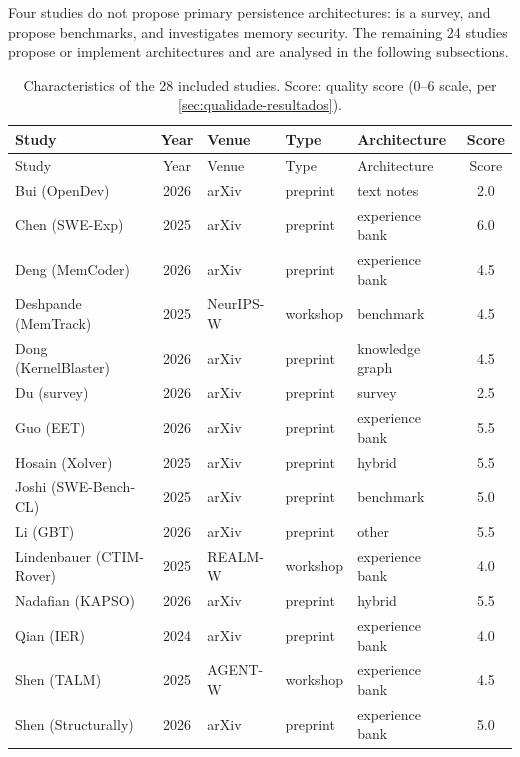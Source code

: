 Four studies do not propose primary persistence architectures:
\citet{du2026memory} is a survey,
\citet{deshpande2025memtrack} and \citet{joshi2025swebenchcl}
propose benchmarks, and
\citet{srivastava2025memorygraft} investigates memory security.
The remaining 24 studies propose or implement architectures and are
analysed in the following subsections.

\begin{longtable}{l c l l l S[table-format=1.1]}
  \caption{Characteristics of the 28 included studies.
    Score: quality score (0--6 scale, per
    \autoref{sec:qualidade-resultados}).}
  \label{tab:caracteristicas} \\
  \toprule
  Study & Year & Venue & Type & Architecture & {Score} \\
  \midrule
  \endfirsthead
  \toprule
  Study & Year & Venue & Type & Architecture & {Score} \\
  \midrule
  \endhead
  \bottomrule
  \endfoot
  Bui (OpenDev) & 2026 & arXiv & preprint & text notes & 2.0 \\
  Chen (SWE-Exp) & 2025 & arXiv & preprint & experience bank & 6.0 \\
  Deng (MemCoder) & 2026 & arXiv & preprint & experience bank & 4.5 \\
  Deshpande (MemTrack) & 2025 & NeurIPS-W & workshop & benchmark & 4.5 \\
  Dong (KernelBlaster) & 2026 & arXiv & preprint & knowledge graph & 4.5 \\
  Du (survey) & 2026 & arXiv & preprint & survey & 2.5 \\
  Guo (EET) & 2026 & arXiv & preprint & experience bank & 5.5 \\
  Hosain (Xolver) & 2025 & arXiv & preprint & hybrid & 5.5 \\
  Joshi (SWE-Bench-CL) & 2025 & arXiv & preprint & benchmark & 5.0 \\
  Li (GBT) & 2026 & arXiv & preprint & other & 5.5 \\
  Lindenbauer (CTIM-Rover) & 2025 & REALM-W & workshop & experience bank & 4.0 \\
  Nadafian (KAPSO) & 2026 & arXiv & preprint & hybrid & 5.5 \\
  Qian (IER) & 2024 & arXiv & preprint & experience bank & 4.0 \\
  Shen (TALM) & 2025 & AGENT-W & workshop & experience bank & 4.5 \\
  Shen (Structurally) & 2026 & arXiv & preprint & experience bank & 5.0 \\

\end{longtable}
